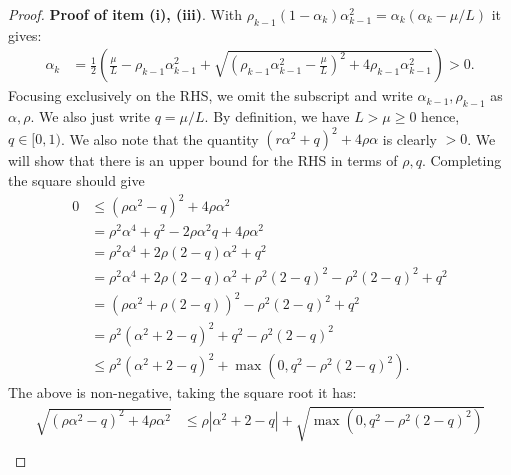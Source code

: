 \documentclass[12pt]{article}
\begin{document}
    \begin{proof}
        \textbf{Proof of item (i), (iii)}. 
        With $\rho_{k - 1}(1 - \alpha_k)\alpha_{k - 1}^2 = \alpha_k(\alpha_k - \mu/L)$ it gives: 
        \begin{align*}
            \alpha_k 
            &= \frac{1}{2}\left(
                \frac{\mu}{L} - \rho_{k - 1}\alpha_{k - 1}^2
                + \sqrt{
                    \left(
                        \rho_{k - 1}\alpha_{k - 1}^2 - \frac{\mu}{L}
                    \right)^2 
                    + 4\rho_{k - 1}\alpha_{k - 1}^2
                }
            \right)
            > 0. 
        \end{align*}
        Focusing exclusively on the RHS, we omit the subscript and write $\alpha_{k - 1}, \rho_{k - 1}$ as $\alpha, \rho$. 
        We also just write $q = \mu / L$. 
        By definition, we have $L > \mu \ge 0$ hence, $q \in [0, 1)$.
        We also note that the quantity $(r \alpha^2 + q)^2 + 4\rho \alpha$ is clearly $> 0$. 
        We will show that there is an upper bound for the RHS in terms of $\rho, q$. 
        Completing the square should give
        \begin{align*}
            0 &\le 
            \left(
                \rho \alpha^2 - q
            \right)^2 + 4 \rho \alpha^2
            \\
            &= \rho^2\alpha^4 + q^2 - 2\rho\alpha^2q + 4 \rho \alpha^2
            \\
            &= \rho^2\alpha^4 + 2\rho(2 - q)\alpha^2 + q^2
            \\
            &= 
            \rho^2\alpha^4 + 2\rho(2 - q)\alpha^2 
            + \rho^2(2 - q)^2
            - \rho^2(2 - q)^2
            + q^2
            \\
            &= (\rho\alpha^2 + \rho(2 - q))^2 - \rho^2 (2 - q)^2 + q^2
            \\
            &= \rho^2(\alpha^2 + 2 - q)^2 
            + q^2 
            - \rho^2 (2 - q)^2
            \\
            &\le 
            \rho^2(\alpha^2 + 2 - q)^2 
            + \max(0, q^2 - \rho^2 (2 - q)^2). 
        \end{align*}
        The above is non-negative, taking the square root it has: 
        \begin{align*}
            \sqrt{\left(\rho \alpha^2 - q\right)^2 + 4 \rho \alpha^2} 
            &\le 
            \rho|\alpha^2 + 2 - q| 
            + \sqrt{\max(0, q^2 - \rho^2 (2 - q)^2)}
            \\

\end{align*}
\end{proof}
\end{document}
